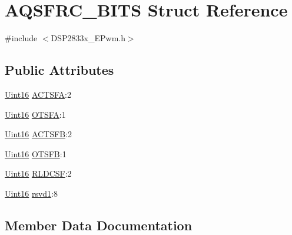 \hypertarget{struct_a_q_s_f_r_c___b_i_t_s}{}\section{A\+Q\+S\+F\+R\+C\+\_\+\+B\+I\+T\+S Struct Reference}
\label{struct_a_q_s_f_r_c___b_i_t_s}


{\ttfamily \#include $<$D\+S\+P2833x\+\_\+\+E\+Pwm.\+h$>$}

\subsection*{Public Attributes}
\begin{DoxyCompactItemize}
\item 
\hyperlink{_d_s_p2833x___device_8h_a59a9f6be4562c327cbfb4f7e8e18f08b}{Uint16} \hyperlink{struct_a_q_s_f_r_c___b_i_t_s_a94304a5650936384e1c6d9ef1d502696}{A\+C\+T\+S\+F\+A}\+:2
\item 
\hyperlink{_d_s_p2833x___device_8h_a59a9f6be4562c327cbfb4f7e8e18f08b}{Uint16} \hyperlink{struct_a_q_s_f_r_c___b_i_t_s_a12d5c4663ef97ea99a719b5c287f8996}{O\+T\+S\+F\+A}\+:1
\item 
\hyperlink{_d_s_p2833x___device_8h_a59a9f6be4562c327cbfb4f7e8e18f08b}{Uint16} \hyperlink{struct_a_q_s_f_r_c___b_i_t_s_a2325e022063bd6236599bc11b0d54d84}{A\+C\+T\+S\+F\+B}\+:2
\item 
\hyperlink{_d_s_p2833x___device_8h_a59a9f6be4562c327cbfb4f7e8e18f08b}{Uint16} \hyperlink{struct_a_q_s_f_r_c___b_i_t_s_addae1cf0fc0a6654ff49cc4311bc74f4}{O\+T\+S\+F\+B}\+:1
\item 
\hyperlink{_d_s_p2833x___device_8h_a59a9f6be4562c327cbfb4f7e8e18f08b}{Uint16} \hyperlink{struct_a_q_s_f_r_c___b_i_t_s_a02d6835af69c7330aa1d694c88005806}{R\+L\+D\+C\+S\+F}\+:2
\item 
\hyperlink{_d_s_p2833x___device_8h_a59a9f6be4562c327cbfb4f7e8e18f08b}{Uint16} \hyperlink{struct_a_q_s_f_r_c___b_i_t_s_a9ebf0b80bd7387ea41f97cf94c3e7d49}{rsvd1}\+:8
\end{DoxyCompactItemize}


\subsection{Member Data Documentation}
\hypertarget{struct_a_q_s_f_r_c___b_i_t_s_a94304a5650936384e1c6d9ef1d502696}{}
